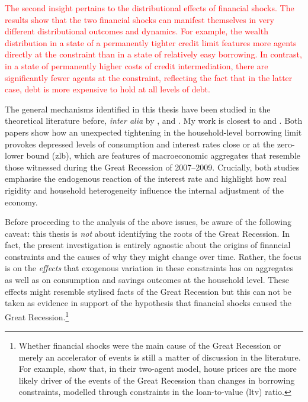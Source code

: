 \documentclass[12pt]{article} %
\numberwithin{equation}{section} %
\begin{document}
\textcolor{red}{The second insight pertains to the distributional effects of financial shocks. The results show that the two financial shocks can manifest themselves in very different distributional outcomes and dynamics. For example, the wealth distribution in a state of a permanently tighter credit limit features more agents directly at the constraint than in a state of relatively easy borrowing. In contrast, in a state of permanently higher costs of credit intermediation, there are significantly fewer agents at the constraint, reflecting the fact that in the latter case, debt is more expensive to hold at all levels of debt.}

The general mechanisms identified in this thesis have been studied in the theoretical literature before, \textit{inter alia} by \textcite{egg2012}, \textcite{riosrull2015} and \textcite{gl2017}. My work is closest to \textcite{egg2012} and \textcite{gl2017}. Both papers show how an unexpected tightening in the household-level borrowing limit provokes depressed levels of consumption and interest rates close or at the zero-lower bound (\Gls{zlb}), which are features of macroeconomic aggregates that resemble those witnessed during the Great Recession of 2007--2009. Crucially, both studies emphasise the endogenous reaction of the interest rate and highlight how real rigidity and household heterogeneity influence the internal adjustment of the economy.

Before proceeding to the analysis of the above issues, be aware of the following caveat: this thesis is \textit{not} about identifying the roots of the Great Recession. In fact, the present investigation is entirely agnostic about the origins of financial constraints and the causes of why they might change over time. Rather, the focus is on the \textit{effects} that exogenous variation in these constraints has on aggregates as well as on consumption and savings outcomes at the household level. These effects might resemble stylised facts of the Great Recession but this can not be taken as evidence in support of the hypothesis that financial shocks caused the Great Recession.\footnote{Whether financial shocks were the main cause of the Great Recession or merely an accelerator of events is still a matter of discussion in the literature. For example, \textcite{justiniano2015} show that, in their two-agent model, house prices are the more likely driver of the events of the Great Recession than changes in borrowing constraints, modelled through constraints in the loan-to-value (\Gls{ltv}) ratio.}
\end{document}
